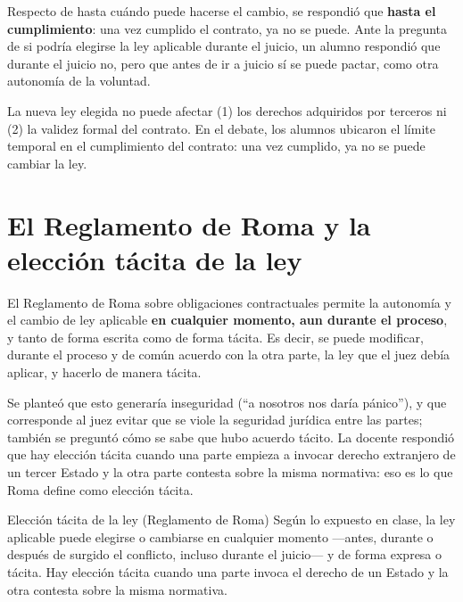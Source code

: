 \documentclass[12pt,oneside]{book}
\begin{document}
Respecto de hasta cu\'ando puede hacerse el cambio, se respondi\'o que \textbf{hasta el cumplimiento}: una vez cumplido el contrato, ya no se puede. Ante la pregunta de si podr\'ia elegirse la ley aplicable durante el juicio, un alumno respondi\'o que durante el juicio no, pero que antes de ir a juicio s\'i se puede pactar, como otra autonom\'ia de la voluntad.

\begin{important}
La nueva ley elegida no puede afectar (1) los derechos adquiridos por terceros ni (2) la validez formal del contrato. En el debate, los alumnos ubicaron el l\'imite temporal en el cumplimiento del contrato: una vez cumplido, ya no se puede cambiar la ley.
\end{important}

\section{El Reglamento de Roma y la elecci\'on t\'acita de la ley}


El Reglamento de Roma sobre obligaciones contractuales permite la autonom\'ia y el cambio de ley aplicable \textbf{en cualquier momento, aun durante el proceso}, y tanto de forma escrita como de forma t\'acita. Es decir, se puede modificar, durante el proceso y de com\'un acuerdo con la otra parte, la ley que el juez deb\'ia aplicar, y hacerlo de manera t\'acita.

Se plante\'o que esto generar\'ia inseguridad (``a nosotros nos dar\'ia p\'anico''), y que corresponde al juez evitar que se viole la seguridad jur\'idica entre las partes; tambi\'en se pregunt\'o c\'omo se sabe que hubo acuerdo t\'acito. La docente respondi\'o que hay elecci\'on t\'acita cuando una parte empieza a invocar derecho extranjero de un tercer Estado y la otra parte contesta sobre la misma normativa: eso es lo que Roma define como elecci\'on t\'acita.

\begin{definition}{Elecci\'on t\'acita de la ley (Reglamento de Roma)}
Seg\'un lo expuesto en clase, la ley aplicable puede elegirse o cambiarse en cualquier momento ---antes, durante o despu\'es de surgido el conflicto, incluso durante el juicio--- y de forma expresa o t\'acita. Hay elecci\'on t\'acita cuando una parte invoca el derecho de un Estado y la otra contesta sobre la misma normativa.
\end{definition}
\end{document}
